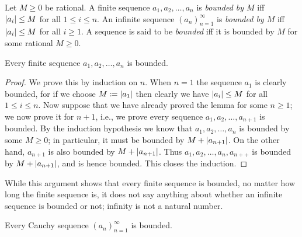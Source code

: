 \begin{definition}\label{5.1.12}
Let \(M \geq 0\) be rational.
A finite sequence \(a_1, a_2, \dots, a_n\) is \emph{bounded by \(M\)} iff \(\abs*{a_i} \leq M\) for all \(1 \leq i \leq n\).
An infinite sequence \((a_n)_{n = 1}^{\infty}\) is \emph{bounded by \(M\)} iff \(\abs*{a_i} \leq M\) for all \(i \geq 1\).
A sequence is said to be \emph{bounded} iff it is bounded by \(M\) for some rational \(M \geq 0\).
\end{definition}

\setcounter{theorem}{13}
\begin{lemma}\label{5.1.14}
Every finite sequence \(a_1, a_2, \dots, a_n\) is bounded.
\end{lemma}

\begin{proof}
We prove this by induction on \(n\).
When \(n = 1\) the sequence \(a_1\) is clearly bounded, for if we choose \(M \coloneqq \abs*{a_1}\) then clearly we have \(\abs*{a_i} \leq M\) for all \(1 \leq i \leq n\).
Now suppose that we have already proved the lemma for some \(n \geq 1\);
we now prove it for \(n + 1\), i.e., we prove every sequence \(a_1, a_2, \dots, a_{n + 1}\) is bounded.
By the induction hypothesis we know that \(a_1, a_2, \dots, a_n\) is bounded by some \(M \geq 0\);
in particular, it must be bounded by \(M + \abs*{a_{n + 1}}\).
On the other hand, \(a_{n + 1}\) is also bounded by \(M + \abs*{a_{n + 1}}\).
Thus \(a_1, a_2, \dots, a_n, a_{n++}\) is bounded by \(M + \abs*{a_{n + 1}}\), and is hence bounded.
This closes the induction.
\end{proof}

\begin{note}
While this argument shows that every finite sequence is bounded, no matter how long the finite sequence is, it does not say anything about whether an infinite sequence is bounded or not;
infinity is not a natural number.
\end{note}

\begin{lemma}\label{5.1.15}
Every Cauchy sequence \((a_n)_{n = 1}^{\infty}\) is bounded.
\end{lemma}

